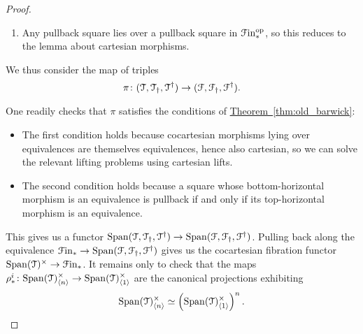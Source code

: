 \documentclass[main.tex]{subfiles}
\begin{document}
\begin{proof}
\begin{enumerate}
    \item Any pullback square lies over a pullback square in $\mathcal{F}\mathrm{in}_{*}^{\mathrm{op}}$, so this reduces to the lemma about cartesian morphisms.
  \end{enumerate}

  We thus consider the map of triples
  \begin{equation*}
    \pi\colon (\mathcal{T}, \mathcal{T}_{\dagger}, \mathcal{T}^{\dagger}) \to (\mathcal{F}, \mathcal{F}_{\dagger}, \mathcal{F}^{\dagger}).
  \end{equation*}

  One readily checks that $\pi$ satisfies the conditions of \hyperref[thm:old_barwick]{Theorem~\ref*{thm:old_barwick}}:
  \begin{itemize}
    \item The first condition holds because cocartesian morphisms lying over equivalences are themselves equivalences, hence also cartesian, so we can solve the relevant lifting problems using cartesian lifts.

    \item The second condition holds because a square whose bottom-horizontal morphism is an equivalence is pullback if and only if its top-horizontal morphism is an equivalence.
  \end{itemize}

  This gives us a functor $\mathrm{Span}(\mathcal{T}, \mathcal{T}_{\dagger}, \mathcal{T}^{\dagger}) \to \mathrm{Span}(\mathcal{F}, \mathcal{F}_{\dagger}, \mathcal{F}^{\dagger})$. Pulling back along the equivalence $\mathcal{F}\mathrm{in}_{*} \to \mathrm{Span}(\mathcal{F}, \mathcal{F}_{\dagger}, \mathcal{F}^{\dagger})$ gives us the cocartesian fibration functor $\mathrm{Span}(\mathcal{T})^{\times} \to \mathcal{F}\mathrm{in}_{*}$. It remains only to check that the maps $\rho^{i}_{*}\colon \mathrm{Span}(\mathcal{T})^{\times}_{\langle n \rangle} \to \mathrm{Span}(\mathcal{T})^{\times}_{\langle 1 \rangle}$ are the canonical projections exhibiting
  \begin{equation*}
    \mathrm{Span}(\mathcal{T})^{\times}_{\langle n \rangle} \simeq \left( \mathrm{Span}(\mathcal{T})^{\times}_{\langle 1 \rangle} \right)^{n}.
  \end{equation*}


\end{proof}
\end{document}
